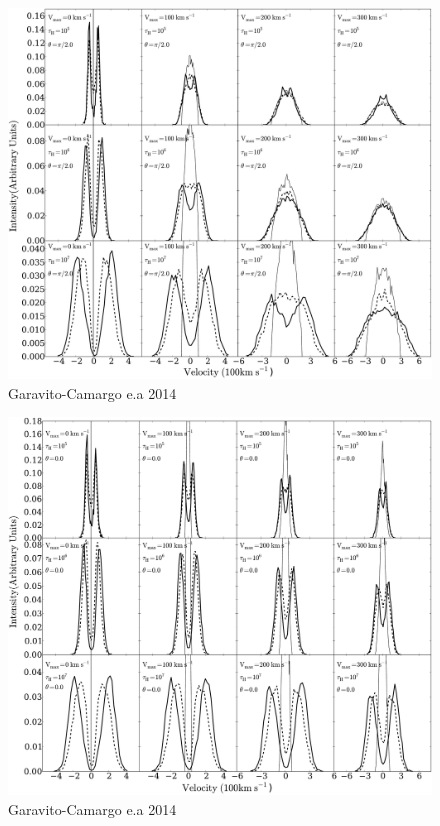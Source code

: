 \documentclass{beamer}
\begin{document}
\begin{frame}
\begin{figure}
\includegraphics[scale=0.2]{Figures/f4.pdf}
\caption*{Garavito-Camargo e.a 2014}
\end{figure}
\end{frame}

\begin{frame}
\begin{figure}
\includegraphics[scale=0.2]{Figures/f4-2.pdf}
\caption*{Garavito-Camargo e.a 2014}
\end{figure}
\end{frame}
\end{document}

